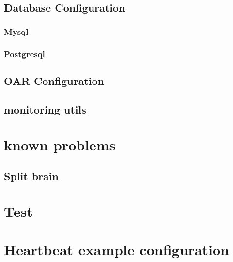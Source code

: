 \documentclass[a4paper,10pt]{report}
\begin{document}
\section{Database Configuration}

\subsection{Mysql}
\subsection{Postgresql}

\section{OAR Configuration}


\section{monitoring utils}


\chapter{known problems}
\section{Split brain}
\label{splitbrain} 

\chapter{Test}
















\appendix
\chapter{Heartbeat example configuration}
\label{cibexample}
\end{document}
